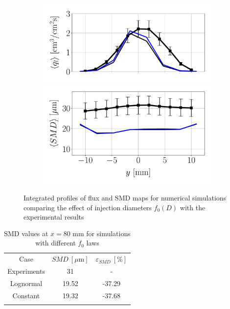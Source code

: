 \begin{figure}[ht]
\begin{subfigure}[b]{0.4\textwidth}
	\flushleft
   \includegraphics[scale=0.35]{./part2_developments/figures_ch6_lagrangian_JICF/params_f0/profiles/flux_along_y}\\
   \vspace{-0.16in}
   \includegraphics[scale=0.35]{./part2_developments/figures_ch6_lagrangian_JICF/params_f0/profiles/SMD_along_y}
\end{subfigure}

\caption{Integrated profiles of flux and SMD maps for numerical simulations comparing the effect of injection diameters $f_0 \left( D \right)$ with the experimental results}
\label{fig:profiles_LGS_JICF_f0}
\end{figure}

\begin{table}[!h]
\centering
\caption{SMD values at $x = 80$ mm for simulations with different $f_0$ laws}
\begin{tabular}{ccc}
\thickhline
Case & $SMD~\left[\mu \mathrm{m} \right]$ & $\varepsilon_{SMD}~\left[\% \right]$ \\
\thickhline
Experiments & 31 & - \\
Lognormal & 19.52 & -37.29 \\
Constant & 19.32 & -37.68 \\
\thickhline
\end{tabular}
\label{tab:SMD_deviations_f0}
\end{table}




